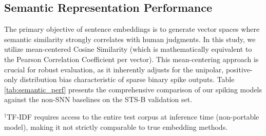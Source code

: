 \documentclass{article} %
\begin{document}
\subsection{Semantic Representation Performance}
The primary objective of sentence embeddings is to generate vector spaces where semantic similarity strongly correlates with human judgments. In this study, we utilize mean-centered Cosine Similarity (which is mathematically equivalent to the Pearson Correlation Coefficient per vector). This mean-centering approach is crucial for robust evaluation, as it inherently adjusts for the unipolar, positive-only distribution bias characteristic of sparse binary spike outputs. Table \ref{tab:semantic_perf} presents the comprehensive comparison of our spiking models against the non-SNN baselines on the STS-B validation set.

\begin{table}[h]
\caption{Comprehensive Comparison of Sentence Representation Methods (STS-B Validation).}
\label{tab:semantic_perf}
\begin{center}
\end{center}
\vspace{-0.2cm}
\small{$^{\dagger}$TF-IDF requires access to the entire test corpus at inference time (non-portable model), making it not strictly comparable to true embedding methods.}
\end{table}
\end{document}
